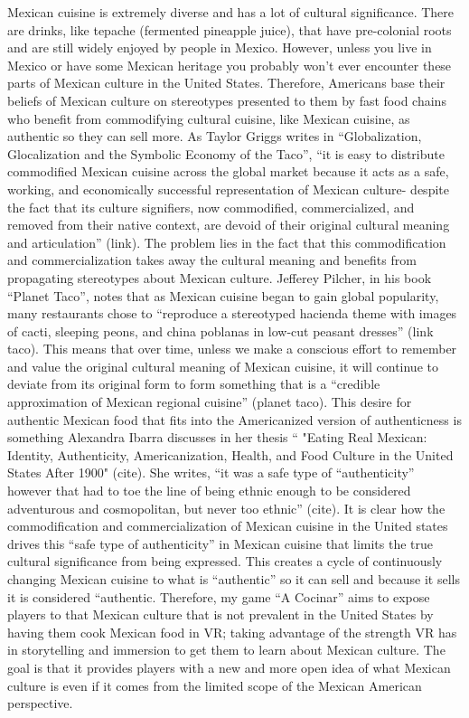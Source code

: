 \documentclass[10pt,twocolumn]{article}
\begin{document}
Mexican cuisine is extremely diverse and has a lot of cultural significance. There are drinks, like tepache (fermented pineapple juice), that have pre-colonial roots and are still widely enjoyed by people in Mexico. However, unless you live in Mexico or have some Mexican heritage you probably won’t ever encounter these parts of Mexican culture in the United States. Therefore, Americans base their beliefs of Mexican culture on stereotypes presented to them by fast food chains who benefit from commodifying cultural cuisine, like Mexican cuisine, as authentic so they can sell more. As Taylor Griggs writes in “Globalization, Glocalization and the Symbolic Economy of the Taco”, “it is easy to distribute commodified Mexican cuisine across the global market because it acts as a safe, working, and economically successful representation of Mexican culture- despite the fact that its culture signifiers, now commodified, commercialized, and removed from their native context, are devoid of their original cultural meaning and articulation” (link). The problem lies in the fact that this commodification and commercialization takes away the cultural meaning and benefits from propagating stereotypes about Mexican culture. Jefferey Pilcher, in his book “Planet Taco”, notes that as Mexican cuisine began to gain global popularity, many restaurants chose to “reproduce a stereotyped hacienda theme with images of cacti, sleeping peons, and china poblanas in low-cut peasant dresses” (link taco). This means that over time, unless we make a conscious effort to remember and value the original cultural meaning of Mexican cuisine, it will continue to deviate from its original form to form something that is a “credible approximation of Mexican regional cuisine” (planet taco). This desire for authentic Mexican food that fits into the Americanized version of authenticness is something Alexandra Ibarra discusses in her thesis “ "Eating Real Mexican: Identity, Authenticity, Americanization, Health, and Food Culture in the United States After 1900" (cite). She writes, “it was a safe type of “authenticity” however that had to toe the line of being ethnic enough to be considered adventurous and cosmopolitan, but never too ethnic” (cite). It is clear how the commodification and commercialization of Mexican cuisine in the United states drives this “safe type of authenticity” in Mexican cuisine that limits the true cultural significance from being expressed. This creates a cycle of continuously changing Mexican cuisine to what is “authentic” so it can sell and because it sells it is considered “authentic. Therefore, my game “A Cocinar” aims to expose players to that Mexican culture that is not prevalent in the United States by having them cook Mexican food in VR; taking advantage of the strength VR has in storytelling and immersion to get them to learn about Mexican culture. The goal is that it provides players with a new and more open idea of what Mexican culture is even if it comes from the limited scope of the Mexican American perspective.
 
\end{document}
